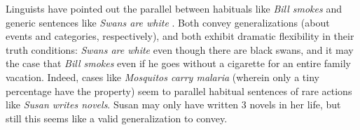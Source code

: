 \documentclass[10pt,letterpaper]{article}
\newcommand{\ndg}[1]{\textcolor{Green}{[ndg: #1]}}
\begin{document}


Linguists have pointed out the parallel between habituals like \emph{Bill smokes} and generic sentences like \emph{Swans are white} \cite{Carlson1977, Carlson2005, Cohen1999}.
Both convey generalizations (about events and categories, respectively), and both exhibit dramatic flexibility in their truth conditions: \emph{Swans are white} even though there are black swans, and it may the case that \emph{Bill smokes} even if he goes without a cigarette for an entire family vacation.
Indeed, cases like \emph{Mosquitos carry malaria} (wherein only a tiny percentage have the property) seem to parallel habitual sentences of rare actions like \emph{Susan writes novels}. Susan may only have written 3 novels in her life, but
 still this seems like a valid generalization to convey.



%
\end{document}

